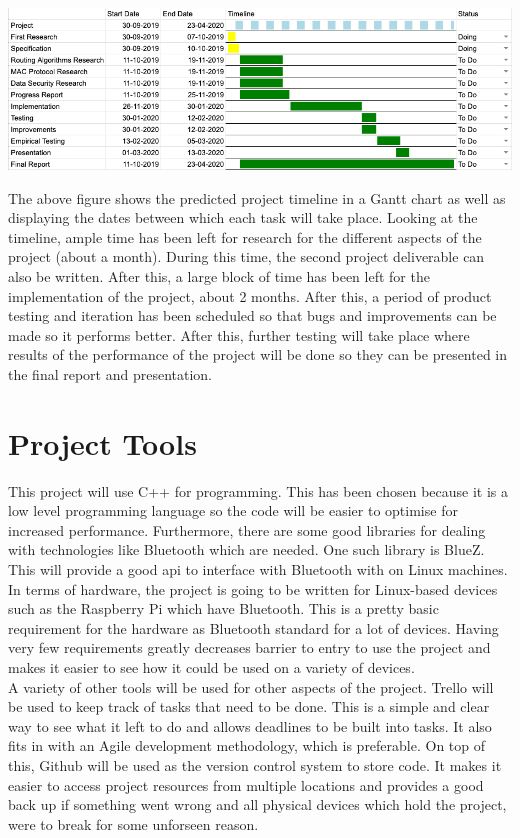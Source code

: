 \documentclass{report}
\begin{document}
\includegraphics[scale=0.35]{ProjectTimeline}

\bigskip

The above figure shows the predicted project timeline in a Gantt chart as well as displaying the dates between 
which each task will take place. Looking at the timeline, ample time has been left for research for the different aspects of the 
project (about a month). During this time, the second project deliverable can also be written. After this, a large block of time 
has been left for the implementation of the project, about 2 months. After this, a period of product testing and iteration has been 
scheduled so that bugs and improvements can be made so it performs better. After this, further testing will take place where results 
of the performance of the project will be done so they can be presented in the final report and presentation. 

\section*{Project Tools}

This project will use C++ for programming. This has been chosen because it is a low level programming language 
so the code will be easier to optimise for increased performance. Furthermore, there are some good libraries 
for dealing with technologies like Bluetooth which are needed. One such library is BlueZ\cite{bluez}. This will 
provide a good api to interface with Bluetooth with on Linux machines.
\bigskip\\
In terms of hardware, the project is going to be written for Linux-based devices such as the Raspberry Pi which have 
Bluetooth. This is a pretty basic requirement for the hardware as Bluetooth standard for a lot of devices. Having 
very few requirements greatly decreases barrier to entry to use the project and makes it easier to see how it could 
be used on a variety of devices. 
\bigskip\\
A variety of other tools will be used for other aspects of the project. Trello will be used to keep track of tasks that 
need to be done. This is a simple and clear way to see what it left to do and allows deadlines to be built into tasks. It 
also fits in with an Agile development methodology, which is preferable. On top of this, Github will be used as the version 
control system to store code. It makes it easier to access project resources from multiple locations and provides a good back 
up if something went wrong and all physical devices which hold the project, were to break for some unforseen reason. 
\end{document}
